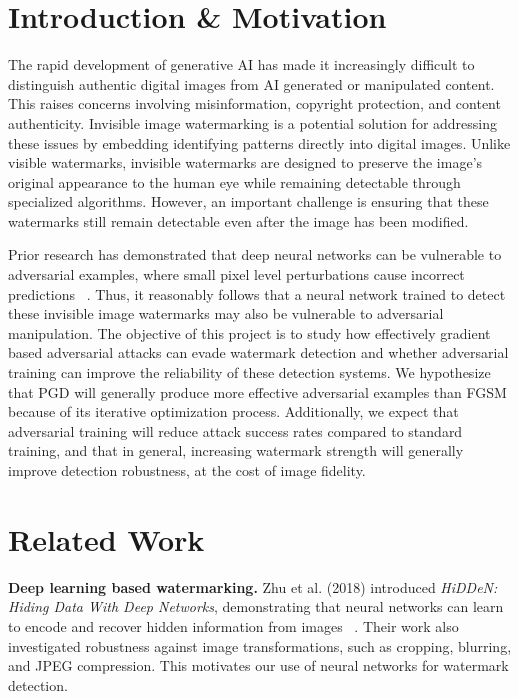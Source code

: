 \documentclass[sigconf, nonacm]{acmart}
\begin{document}
\maketitle


\section{Introduction \& Motivation}
The rapid development of generative AI has made it increasingly difficult to distinguish authentic digital images from AI generated or manipulated content. This raises concerns involving misinformation, copyright protection, and content authenticity. Invisible image watermarking is a potential solution for addressing these issues by embedding identifying patterns directly into digital images. Unlike visible watermarks, invisible watermarks are designed to preserve the image's original appearance to the human eye while remaining detectable through specialized algorithms. However, an important challenge is ensuring that these watermarks still remain detectable even after the image has been modified.

Prior research has demonstrated that deep neural networks can be vulnerable to adversarial examples, where small pixel level perturbations cause incorrect predictions ~\cite{paper7,paper2}. Thus, it reasonably follows that a neural network trained to detect these invisible image watermarks may also be vulnerable to adversarial manipulation. The objective of this project is to study how effectively gradient based adversarial attacks can evade watermark detection and whether adversarial training can improve the reliability of these detection systems. We hypothesize that PGD will generally produce more effective adversarial examples than FGSM because of its iterative optimization process. Additionally, we expect that adversarial training will reduce attack success rates compared to standard training, and that in general, increasing watermark strength will generally improve detection robustness, at the cost of image fidelity.

\section{Related Work}

\textbf{Deep learning based watermarking.} Zhu et al. (2018) introduced \textit{HiDDeN: Hiding Data With Deep Networks}, demonstrating that neural networks can learn to encode and recover hidden information from images ~\cite{paper4}. Their work also investigated robustness against image transformations, such as cropping, blurring, and JPEG compression. This motivates our use of neural networks for watermark detection.
\end{document}
